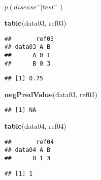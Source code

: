 \documentclass[]{article}
\newenvironment{Shaded}{\begin{snugshade}}{\end{snugshade}}
\newcommand{\CommentTok}[1]{\textcolor[rgb]{0.56,0.35,0.01}{\textit{#1}}}
\newcommand{\KeywordTok}[1]{\textcolor[rgb]{0.13,0.29,0.53}{\textbf{#1}}}
\newcommand{\NormalTok}[1]{#1}
\begin{document}
\(p(disease^-|test^-)\)

\begin{Shaded}
\begin{Highlighting}[]
\KeywordTok{table}\NormalTok{(data03, ref03)}
\end{Highlighting}
\end{Shaded}

\begin{verbatim}
##       ref03
## data03 A B
##      A 0 1
##      B 0 3
\end{verbatim}

\begin{Shaded}
\end{Shaded}

\begin{verbatim}
## [1] 0.75
\end{verbatim}

\begin{Shaded}
\begin{Highlighting}[]
\KeywordTok{negPredValue}\NormalTok{(data03, ref03) }
\end{Highlighting}
\end{Shaded}

\begin{verbatim}
## [1] NA
\end{verbatim}

\begin{Shaded}
\begin{Highlighting}[]
\KeywordTok{table}\NormalTok{(data04, ref04)}
\end{Highlighting}
\end{Shaded}

\begin{verbatim}
##       ref04
## data04 A B
##      B 1 3
\end{verbatim}

\begin{Shaded}
\end{Shaded}

\begin{verbatim}
## [1] 1
\end{verbatim}
\end{document}
